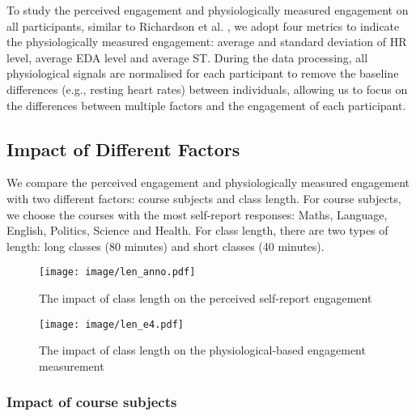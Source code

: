 \documentclass[sigconf]{acmart}
\begin{document}

To study the perceived engagement and physiologically measured engagement on all participants, similar to Richardson et al. \cite{richardson2020engagement}, we adopt four metrics to indicate the physiologically measured engagement: average and standard deviation of HR level, average EDA level and average ST. During the data processing, all physiological signals are normalised for each participant to remove the baseline differences (e.g., resting heart rates) between individuals, allowing us to focus on the differences between multiple factors and the engagement of each participant.

\subsection{Impact of Different Factors}

We compare the perceived engagement and physiologically measured engagement with two different factors: course subjects and class length. For course subjects, we choose the courses with the most self-report responses: Maths, Language, English, Politics, Science and Health. For class length, there are two types of length: long classes (80 minutes) and short classes (40 minutes).

\begin{figure*}
    \centering
    \texttt{[image: image/len\_anno.pdf]}
    \caption{The impact of class length on the perceived self-report engagement}
    \label{fig:impact_lent_anno}
\end{figure*}


\begin{figure*}
    \centering
    \texttt{[image: image/len\_e4.pdf]}
    \caption{The impact of class length on the physiological-based engagement measurement}
    \label{fig:impact_len}
\end{figure*}

\subsubsection{Impact of course subjects}
\end{document}
